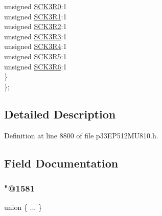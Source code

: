 \begin{DoxyCompactItemize}
\begin{tabbing}
\>\>unsigned \hyperlink{structtag_r_p_i_n_r29_b_i_t_s_a3049ab31a9bb3b4643807faf78d25962}{SCK3R0}:1\\
\>\>unsigned \hyperlink{structtag_r_p_i_n_r29_b_i_t_s_ad1eb2fc33403649397af2744530f4ce3}{SCK3R1}:1\\
\>\>unsigned \hyperlink{structtag_r_p_i_n_r29_b_i_t_s_acfb30c8488244387934e4a01275dc93b}{SCK3R2}:1\\
\>\>unsigned \hyperlink{structtag_r_p_i_n_r29_b_i_t_s_ab82ef2081a1cdf243d34ada6a65b58e6}{SCK3R3}:1\\
\>\>unsigned \hyperlink{structtag_r_p_i_n_r29_b_i_t_s_a87239d8e0d63ec3ef7f49b9fe474e163}{SCK3R4}:1\\
\>\>unsigned \hyperlink{structtag_r_p_i_n_r29_b_i_t_s_afdaab65fc59f5a6c0a313624e74921ad}{SCK3R5}:1\\
\>\>unsigned \hyperlink{structtag_r_p_i_n_r29_b_i_t_s_aaa626183a36ab1bf73252865a4d35e84}{SCK3R6}:1\\
\>\} \\
\}; \\

\end{tabbing}\end{DoxyCompactItemize}


\subsection{Detailed Description}


Definition at line 8800 of file p33\+E\+P512\+M\+U810.\+h.



\subsection{Field Documentation}
\mbox{\label{structtag_r_p_i_n_r29_b_i_t_s_a4b8c02b6975d118ee1359af9bc55f0c1}} 
\subsubsection{\texorpdfstring{"@1581}{@1581}}
{\footnotesize\ttfamily union \{ ... \} }

\mbox{\label{structtag_r_p_i_n_r29_b_i_t_s_adf71f3d8410c1f1dbbc96680a92c49af}} 
